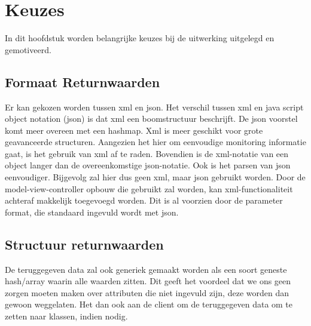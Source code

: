 \newpage
\chapter{Keuzes}
In dit hoofdstuk worden belangrijke keuzes bij de uitwerking uitgelegd en gemotiveerd.

\section{Formaat Returnwaarden}
\npar
Er kan gekozen worden tussen xml en json. Het verschil tussen xml en java script object notation (json) is dat xml een boomstructuur beschrijft. De json voorstel komt meer overeen met een hashmap. Xml is meer geschikt voor grote geavanceerde structuren. Aangezien het hier om eenvoudige monitoring informatie gaat, is het gebruik van xml af te raden. Bovendien is de xml-notatie van een object langer dan de overeenkomstige json-notatie. Ook is het parsen van json eenvoudiger. Bijgevolg zal hier dus geen xml, maar json gebruikt worden. Door de model-view-controller opbouw die gebruikt zal worden, kan xml-functionaliteit achteraf makkelijk toegevoegd worden. Dit is al voorzien door de parameter format, die standaard ingevuld wordt met json.

\section{Structuur returnwaarden}
\npar
De teruggegeven data zal ook generiek gemaakt worden als een soort geneste hash/array waarin alle waarden zitten. Dit geeft het voordeel dat we ons geen zorgen moeten maken over attributen die niet ingevuld zijn, deze worden dan gewoon weggelaten. Het dan ook aan de client om de teruggegeven data om te zetten naar klassen, indien nodig.
\clearpage
